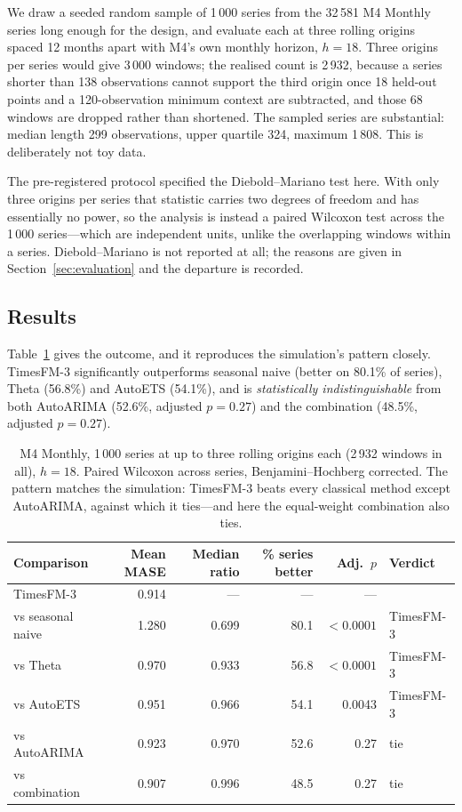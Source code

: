 \documentclass[article]{ajs}
\providecommand{\sectionref}[1]{Section~\ref{#1}}
\providecommand{\tableref}[1]{Table~\ref{#1}}
\begin{document}
We draw a seeded random sample of 1\,000 series from the 32\,581 M4 Monthly series long enough
for the design, and evaluate each at three rolling origins spaced 12 months apart with M4's own
monthly horizon, $h = 18$. Three origins per series would give 3\,000 windows; the realised
count is 2\,932, because a series shorter than 138 observations cannot support the third
origin once 18 held-out points and a 120-observation minimum context are subtracted, and those
68 windows are dropped rather than shortened. The sampled series are substantial: median
length 299 observations, upper quartile 324, maximum 1\,808. This is deliberately not toy data.

The pre-registered protocol specified the Diebold--Mariano test here. With only three origins per
series that statistic carries two degrees of freedom and has essentially no power, so the analysis
is instead a paired Wilcoxon test across the 1\,000 series---which are independent units, unlike
the overlapping windows within a series. Diebold--Mariano is not reported at all; the reasons are
given in \sectionref{sec:evaluation} and the departure is recorded.

\subsection{Results}

\tableref{tab:realdata} gives the outcome, and it reproduces the simulation's pattern closely.
TimesFM-3 significantly outperforms seasonal naive (better on 80.1\% of series), Theta (56.8\%)
and AutoETS (54.1\%), and is \emph{statistically indistinguishable} from both AutoARIMA (52.6\%,
adjusted $p = 0.27$) and the combination (48.5\%, adjusted $p = 0.27$).

\begin{table}[t!]
\centering
\caption{M4 Monthly, 1\,000 series at up to three rolling origins each (2\,932 windows in all),
$h = 18$. Paired Wilcoxon across
series, Benjamini--Hochberg corrected. The pattern matches the simulation: TimesFM-3 beats every
classical method except AutoARIMA, against which it ties---and here the equal-weight combination
also ties.}
\label{tab:realdata}
\begin{tabular}{lrrrrl}
\toprule
Comparison & Mean MASE & Median ratio & \% series better & Adj.\ $p$ & Verdict \\
\midrule
TimesFM-3          & 0.914 & ---   & ---  & ---    & \\
\midrule
vs seasonal naive  & 1.280 & 0.699 & 80.1 & $<0.0001$ & TimesFM-3 \\
vs Theta           & 0.970 & 0.933 & 56.8 & $<0.0001$ & TimesFM-3 \\
vs AutoETS         & 0.951 & 0.966 & 54.1 & 0.0043    & TimesFM-3 \\
vs AutoARIMA       & 0.923 & 0.970 & 52.6 & 0.27      & tie \\
vs combination     & 0.907 & 0.996 & 48.5 & 0.27      & tie \\
\bottomrule
\end{tabular}
\end{table}
\end{document}
